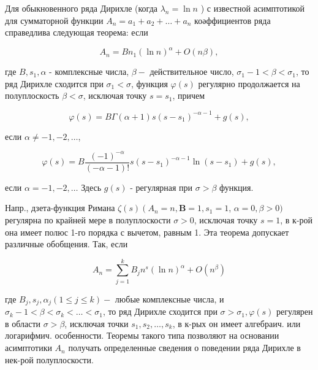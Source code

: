 \documentclass[10pt]{article}
\begin{document}
Для обыкновенного ряда Дирихле (когда $\lambda_{n}=\ln n$ ) с известной асимптотикой для сумматорной функции $A_{n}=a_{1}+a_{2}+\ldots+a_{n}$ коәффициентов ряда справедлива следующая теорема: если



\[

A_{n}=B n_{1}(\ln n)^{\alpha}+O(n \beta),

\]



где $B, s_{1}, \alpha$ - комплексные числа, $\beta-$ действительное число, $\sigma_{1}-1<\beta<\sigma_{1}$, то ряд Дирихле сходится при $\sigma_{1}<\sigma$, функция $\varphi(s)$ регулярно продолжается на полуплоскость $\beta<\sigma$, исключая точку $s=s_{1}$, причем



\[

\varphi(s)=B \Gamma(\alpha+1) s\left(s-s_{1}\right)^{-\alpha-1}+g(s),

\]



если $\alpha \neq-1,-2, \ldots$,



\[

\varphi(s)=B \frac{(-1)^{-\alpha}}{(-\alpha-1) !} s\left(s-s_{1}\right)^{-\alpha-1} \ln \left(s-s_{1}\right)+g(s),

\]



если $\alpha=-1,-2, \ldots$ Здесь $g(s)$ - регулярная при $\sigma>\beta$ функция.



Напр., дзета-функция Римана $\zeta(s)\left(A_{n}=n, \boldsymbol{B}=1, s_{1}=1\right.$, $\alpha=0, \beta>0)$ регулярна по крайней мере в полуплоскости $\sigma>0$, исключая точку $s=1$, в к-рой она имеет полюс 1-го порядка с вычетом, равным 1. Эта теорема допускает различные обобщения. Так, если



\[

A_{n}=\sum_{j=1}^{k} B_{j} n^{s}(\ln n)^{\alpha}+O\left(n^{\beta}\right)

\]



где $B_{j}, s_{j}, \alpha_{j}(1 \leqslant j \leqslant k)-$ любые комплексные числа, и $\sigma_{k}-1<\beta<\sigma_{k}<\ldots<\sigma_{1}$, то ряд Дирихле сходится при $\sigma>\sigma_{1}, \varphi(s)$ регулярен в области $\sigma>\beta$, исключая точки $s_{1}, s_{2}, \ldots, s_{k}$, в к-рых он имеет алгебраич. или логарифмич. особенности. Теоремы такого типа позволяют на основании асимптотики $A_{n}$ получать определенные сведения о поведении ряда Дирихле в нек-рой полуплоскости.
\end{document}

